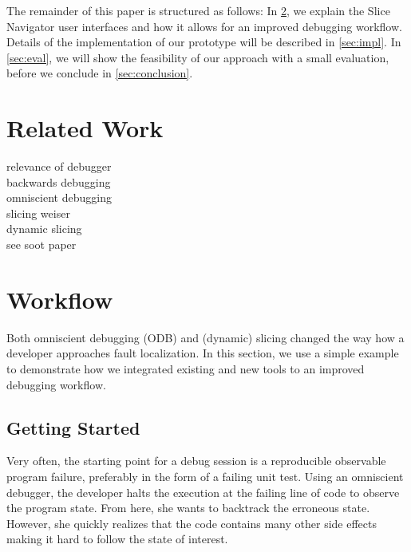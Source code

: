 ﻿\documentclass[
      english,
      ]{llncs}
\begin{document}

The remainder of this paper is structured as follows:
In \cref{sec:workflow}, we explain the Slice Navigator user interfaces and how it allows for an improved debugging workflow.
Details of the implementation of our prototype will be described in \cref{sec:impl}.
In \cref{sec:eval}, we will show the feasibility of our approach with a small evaluation, before we conclude in \cref{sec:conclusion}.

\section{Related Work}

relevance of debugger\\

backwards debugging\\
omniscient debugging\\

slicing weiser \cite{weiser_programmers_1982} \\
dynamic slicing\\
see soot paper\\

\section{Workflow}
\label{sec:workflow}

Both omniscient debugging (ODB) and (dynamic) slicing changed the way how a developer approaches fault localization.
In this section, we use a simple example to demonstrate how we integrated existing and new tools to an improved debugging workflow.


\subsection{Getting Started}

Very often, the starting point for a debug session is a reproducible observable program failure, preferably in the form of a failing unit test.
Using an omniscient debugger, the developer halts the execution at the failing line of code to observe the program state.
From here, she wants to backtrack the erroneous state.
However, she quickly realizes that the code contains many other side effects making it hard to follow the state of interest.
 
\end{document}
